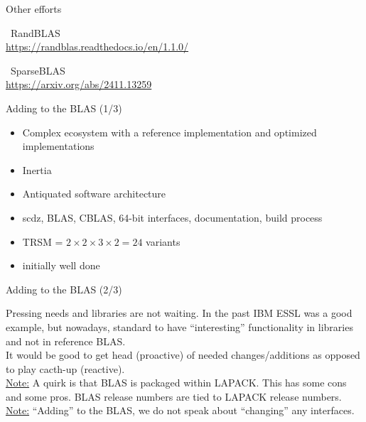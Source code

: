 \documentclass[aspectratio=169]{beamer}
\begin{document}
\begin{frame}{Other efforts}

~RandBLAS\\
\url{https://randblas.readthedocs.io/en/1.1.0/}

~SparseBLAS\\
\url{https://arxiv.org/abs/2411.13259}

\end{frame}


\begin{frame}{Adding to the BLAS (1/3)}

\begin{itemize}
\item Complex ecosystem with a reference implementation and optimized implementations
\item Inertia
\item Antiquated software architecture
\item scdz, BLAS, CBLAS, 64-bit interfaces, documentation, build process
\item TRSM = $2 \times 2 \times 3 \times 2 = 24$ variants
\item initially well done 
\end{itemize}


\end{frame}

\begin{frame}{Adding to the BLAS (2/3)}

Pressing needs and libraries are not waiting. In the past IBM ESSL was a good
example, but nowadays, standard to have ``interesting'' functionality in
libraries and not in reference BLAS.\\

It would be good to get head (proactive) of needed changes/additions as opposed
to play cacth-up (reactive).\\

\underline{Note:} A quirk is that BLAS is packaged within LAPACK. This has some cons and some pros. 
BLAS release numbers are tied to LAPACK release numbers.\\

\underline{Note:} ``Adding'' to the BLAS, we do not speak about ``changing'' any interfaces.

\end{frame}
\end{document}
